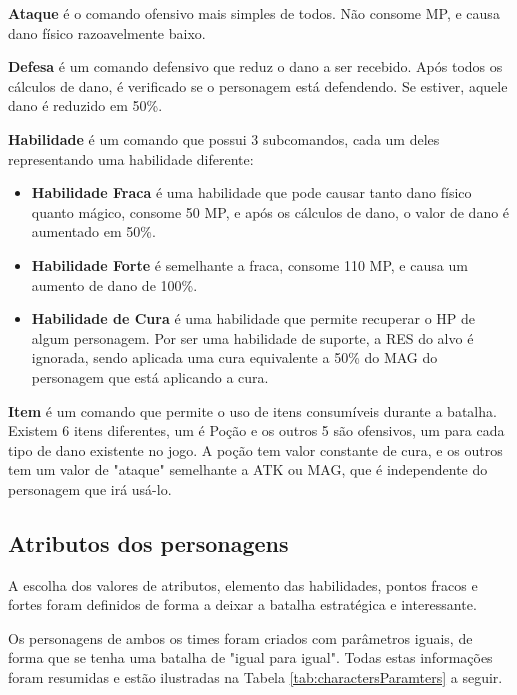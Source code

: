 \documentclass[
	12pt,					%
	openright,				%
	oneside,				%
	a4paper,				%
	bibjustif,				%
	chapter=TITLE,			%
	english,				%
	brazil,					%
	]{abntex2}
\begin{document}
	\textbf{Ataque} é o comando ofensivo mais simples de todos.
	Não consome MP,
	e causa dano físico razoavelmente baixo.
	
	\textbf{Defesa} é um comando defensivo que reduz o dano a ser recebido.
	Após todos os cálculos de dano,
	é verificado se o personagem está defendendo.
	Se estiver, aquele dano é reduzido em 50\%.
	
	\textbf{Habilidade} é um comando que possui 3 subcomandos,
	cada um deles representando uma habilidade diferente:
	
	\begin{itemize}[noitemsep]
    	\item \textbf{Habilidade Fraca} é uma habilidade que pode causar tanto dano físico quanto mágico,
		consome 50 MP,
		e após os cálculos de dano,
		o valor de dano é aumentado em 50\%.
    	\item \textbf{Habilidade Forte} é semelhante a fraca,
    	consome 110 MP,
		e causa um aumento de dano de 100\%.
    	\item \textbf{Habilidade de Cura} é uma habilidade que permite recuperar o HP de algum personagem.
		Por ser uma habilidade de suporte,
		a RES do alvo é ignorada,
		sendo aplicada uma cura equivalente a 50\% do MAG do personagem que está aplicando a cura.
  	\end{itemize}
	
	\textbf{Item} é um comando que permite o uso de itens consumíveis durante a batalha.
	Existem 6 itens diferentes,
	um é Poção e os outros 5 são ofensivos, um para cada tipo de dano existente no jogo.
	A poção tem valor constante de cura,
	e os outros tem um valor de "ataque"{} semelhante a ATK ou MAG,
	que é independente do personagem que irá usá-lo.
	
	\subsection{Atributos dos personagens}
	A escolha dos valores de atributos,
	elemento das habilidades,
	pontos fracos e fortes foram definidos de forma a deixar a batalha estratégica e interessante.

	Os personagens de ambos os times foram criados com parâmetros iguais,
	de forma que se tenha uma batalha de "igual para igual"{}.
	Todas estas informações foram resumidas
	e estão ilustradas na Tabela \ref{tab:charactersParamters} a seguir.
	
\end{document}
